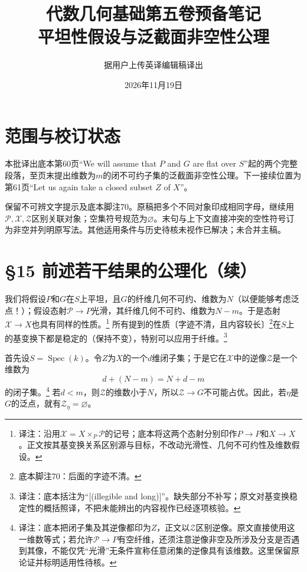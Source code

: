 \documentclass[openany,fontset=fandol]{ctexbook}
\newcommand{\note}[1]{\unskip\nobreak\footnote{译注：#1}}
\begin{document}
\title{代数几何基础第五卷预备笔记\\平坦性假设与泛截面非空性公理}
\author{据用户上传英译编辑稿译出}
\date{2026年11月19日}
\maketitle
\chapter*{范围与校订状态}
本批译出底本第60页“We will assume that $P$ and $G$ are flat over $S$”起的两个完整段落，至页末提出维数为$m$的闭不可约子集的泛截面非空性公理。下一接续位置为第61页“Let us again take a closed subset $Z$ of $X$”。

保留不可辨文字提示及底本脚注70。原稿把多个不同对象印成相同字母，继续用$\mathcal P,\mathcal X,\mathcal Z$区别关联对象；空集符号规范为$\varnothing$。末句与上下文直接冲突的空性符号订为非空并列明原写法。其他适用条件与历史待核未视作已解决；未合并主稿。
\chapter*{§15 前述若干结果的公理化（续）}
我们将假设$P$和$G$在$S$上平坦，且$G$的纤维几何不可约、维数为$N$（以便能够考虑泛点！）；假设态射$\mathcal P\to P$光滑，其纤维几何不可约、维数为$N-m$。于是态射$\mathcal X\to X$也具有同样的性质。\note{沿用$\mathcal X=X\times_P\mathcal P$的记号；底本将这两个态射分别印作$P\to P$和$X\to X$。正文按其基变换关系区别源与目标，不改动光滑性、几何不可约性及维数假设。}
所有提到的性质〔字迹不清，且内容较长〕\footnote{底本脚注70：后面的字迹不清。}在$S$上的基变换下都是稳定的（保持不变），特别可以应用于纤维。\note{底本括注为“[(illegible and long)]”。缺失部分不补写；原文对基变换稳定性的概括照译，不把未能辨出的内容视作已经逐项核验。}

首先设$S=\operatorname{Spec}(k)$。令$Z$为$X$的一个$d$维闭子集；于是它在$\mathcal X$中的逆像$\mathcal Z$是一个维数为
\[
d+(N-m)=N+d-m
\]
的闭子集。\note{底本把闭子集及其逆像都印为$Z$，正文以$\mathcal Z$区别逆像。原文直接使用这一维数等式；若允许$\mathcal P\to P$有空纤维，还须注意逆像非空及所涉及分支是否遇到其像，不能仅凭“光滑”无条件宣称任意闭集的逆像具有该维数。这里保留原论证并标明适用性待核。}
若$d<m$，则$\mathcal Z$的维数小于$N$，所以$\mathcal Z\to G$不可能占优。因此，若$\eta$是$G$的泛点，就有$\mathcal Z_\eta=\varnothing$。
\end{document}
